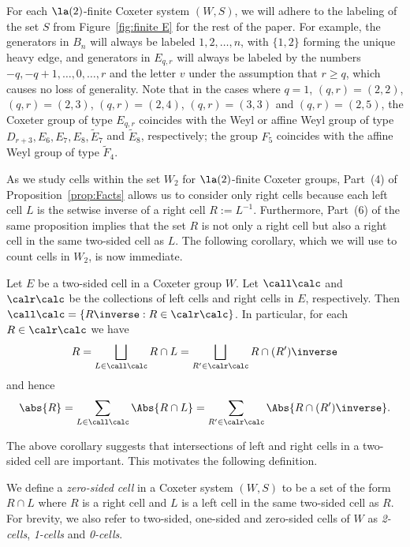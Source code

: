 \begin{remark}
    \label{rmk:labels}
    For each $\la(2)$-finite Coxeter system $(W,S)$, we will adhere to the labeling of the set $S$
    from Figure~\ref{fig:finite E} for the rest of the paper. For example, the generators in $B_n$ will
    always be labeled $1,2,\dots,n$, with $\{1,2\}$ forming the unique heavy edge, and generators in
    $E_{q,r}$ will always be labeled by the numbers $-q,-q+1,\dots, 0,\dots, r$ and the letter $v$
    under the assumption that $r\ge q$, which causes no loss of generality. Note that in the cases
    where $q=1$, $(q,r)=(2,2)$, $(q,r)=(2,3)$, $(q,r)=(2,4)$, $(q,r)=(3,3)$ and $(q,r)=(2,5)$, the Coxeter
    group of type $E_{q,r}$ coincides with the Weyl or affine Weyl group of type $D_{r+3}, E_6, E_7,
    E_8, \tilde E_7$ and $\tilde E_8$, respectively; the group $F_5$ coincides with the affine Weyl
    group of type $\tilde F_4$.
\end{remark}

As we study cells within the set $W_2$ for $\la(2)$-finite Coxeter groups, Part~(4) of
Proposition~\ref{prop:Facts} allows us to consider only right cells because each left cell $L$ is the setwise
inverse of a right cell $R:=L^{-1}$.  Furthermore, Part~(6) of the same proposition implies that the
set $R$ is not only a right cell but also a right cell in the same two-sided cell as $L$. The
following corollary, which we will use to count cells in $W_2$, is now immediate. 

\begin{corollary}
\label{coro:intersection} Let $E$ be a two-sided cell in a Coxeter group $W$. Let $\call\calc$ and
      $\calr\calc$ be the collections of left cells and right cells in $E$, respectively. Then
      $\call\calc=\{R\inverse: R\in \calr\calc\}$. In particular, for each $R\in \calr\calc$ we have
      \[ R=\bigsqcup_{L\in\call\calc}R\cap L=\bigsqcup_{R'\in \calr\calc}R\cap (R')\inverse \] and
      hence \[ \abs{R}=\sum_{L\in\call\calc}\Abs{R\cap L}=\sum_{R'\in \calr\calc}\Abs{R\cap
      (R')\inverse}.  \]
\end{corollary}

The above corollary suggests that intersections of left and right cells in a two-sided cell are
important. This motivates the following definition.
\begin{definition} 
    We define a \emph{zero-sided cell} in a Coxeter system $(W,S)$ to be a set of the form $R\cap L$
    where $R$ is a right cell and $L$ is a left cell in the same two-sided cell as $R$.  For
    brevity, we also refer to two-sided, one-sided and zero-sided cells of $W$ as \emph{2-cells},
    \emph{1-cells} and \emph{0-cells}.
    \label{def:0cells}
\end{definition}

